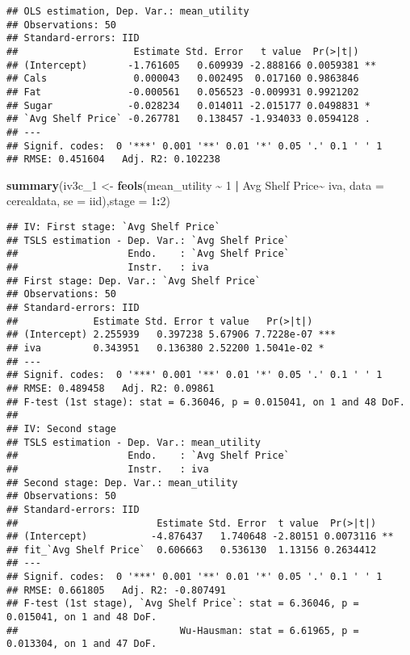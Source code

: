 \documentclass[
]{article}
\newenvironment{Shaded}{\begin{snugshade}}{\end{snugshade}}
\newcommand{\AttributeTok}[1]{\textcolor[rgb]{0.13,0.29,0.53}{#1}}
\newcommand{\DecValTok}[1]{\textcolor[rgb]{0.00,0.00,0.81}{#1}}
\newcommand{\FunctionTok}[1]{\textcolor[rgb]{0.13,0.29,0.53}{\textbf{#1}}}
\newcommand{\NormalTok}[1]{#1}
\newcommand{\OtherTok}[1]{\textcolor[rgb]{0.56,0.35,0.01}{#1}}
\newcommand{\SpecialCharTok}[1]{\textcolor[rgb]{0.81,0.36,0.00}{\textbf{#1}}}
\newcommand{\StringTok}[1]{\textcolor[rgb]{0.31,0.60,0.02}{#1}}
\begin{document}
\begin{verbatim}
## OLS estimation, Dep. Var.: mean_utility
## Observations: 50
## Standard-errors: IID 
##                    Estimate Std. Error   t value  Pr(>|t|)    
## (Intercept)       -1.761605   0.609939 -2.888166 0.0059381 ** 
## Cals               0.000043   0.002495  0.017160 0.9863846    
## Fat               -0.000561   0.056523 -0.009931 0.9921202    
## Sugar             -0.028234   0.014011 -2.015177 0.0498831 *  
## `Avg Shelf Price` -0.267781   0.138457 -1.934033 0.0594128 .  
## ---
## Signif. codes:  0 '***' 0.001 '**' 0.01 '*' 0.05 '.' 0.1 ' ' 1
## RMSE: 0.451604   Adj. R2: 0.102238
\end{verbatim}

\begin{Shaded}
\begin{Highlighting}[]
\FunctionTok{summary}\NormalTok{(iv3c\_1 }\OtherTok{\textless{}{-}} \FunctionTok{feols}\NormalTok{(mean\_utility }\SpecialCharTok{\textasciitilde{}} \DecValTok{1} \SpecialCharTok{|}  \StringTok{\textasciigrave{}}\AttributeTok{Avg Shelf Price}\StringTok{\textasciigrave{}}\SpecialCharTok{\textasciitilde{}}\NormalTok{ iva, }\AttributeTok{data =}\NormalTok{ cerealdata,}
                     \AttributeTok{se =} \StringTok{\textquotesingle{}iid\textquotesingle{}}\NormalTok{),}\AttributeTok{stage =} \DecValTok{1}\SpecialCharTok{:}\DecValTok{2}\NormalTok{)}
\end{Highlighting}
\end{Shaded}

\begin{verbatim}
## IV: First stage: `Avg Shelf Price`
## TSLS estimation - Dep. Var.: `Avg Shelf Price`
##                   Endo.    : `Avg Shelf Price`
##                   Instr.   : iva
## First stage: Dep. Var.: `Avg Shelf Price`
## Observations: 50
## Standard-errors: IID 
##             Estimate Std. Error t value   Pr(>|t|)    
## (Intercept) 2.255939   0.397238 5.67906 7.7228e-07 ***
## iva         0.343951   0.136380 2.52200 1.5041e-02 *  
## ---
## Signif. codes:  0 '***' 0.001 '**' 0.01 '*' 0.05 '.' 0.1 ' ' 1
## RMSE: 0.489458   Adj. R2: 0.09861
## F-test (1st stage): stat = 6.36046, p = 0.015041, on 1 and 48 DoF.
## 
## IV: Second stage
## TSLS estimation - Dep. Var.: mean_utility
##                   Endo.    : `Avg Shelf Price`
##                   Instr.   : iva
## Second stage: Dep. Var.: mean_utility
## Observations: 50
## Standard-errors: IID 
##                        Estimate Std. Error  t value  Pr(>|t|)    
## (Intercept)           -4.876437   1.740648 -2.80151 0.0073116 ** 
## fit_`Avg Shelf Price`  0.606663   0.536130  1.13156 0.2634412    
## ---
## Signif. codes:  0 '***' 0.001 '**' 0.01 '*' 0.05 '.' 0.1 ' ' 1
## RMSE: 0.661805   Adj. R2: -0.807491
## F-test (1st stage), `Avg Shelf Price`: stat = 6.36046, p = 0.015041, on 1 and 48 DoF.
##                            Wu-Hausman: stat = 6.61965, p = 0.013304, on 1 and 47 DoF.
\end{verbatim}
\end{document}
